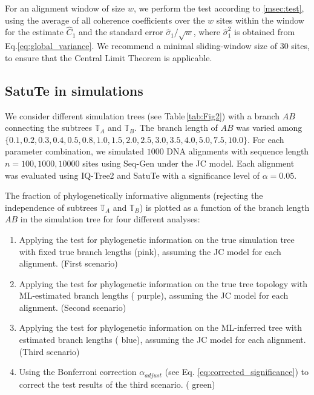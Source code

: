 For an alignment window of size $w$, we perform the test according to \ref{msec:test}, using the average of all coherence coefficients  over the $w$ sites within the window for the estimate $\hat C_1$ and  the standard error $\hat\sigma_1/\sqrt{w}$, where $\hat\sigma_1^2$ is obtained from Eq.\eqref{eq:global_variance}. 
We recommend a minimal sliding-window size of 30 sites, to ensure that the Central Limit Theorem is applicable.

\bigskip

\subsection{SatuTe in simulations}\label{msec:simulations}

We consider different simulation trees (see Table\,\ref{tab:Fig2}) with a branch $AB$ connecting the subtrees $\mathbb{T}_A$ and $\mathbb{T}_B$. The branch length of $AB$ was varied among $\{0.1, 0.2, 0.3, 0.4, 0.5, 0.8, 1.0, 1.5, 2.0, 2.5, 3.0, 3.5, 4.0, 5.0, 7.5, 10.0\}$. For each parameter combination, we simulated  $1000$ DNA alignments with sequence length ${n = 100, 1000, 10000}$ sites using Seq-Gen  under the JC model. Each alignment was evaluated using IQ-Tree2  and SatuTe with a significance level of $\alpha = 0.05$.


\medskip
\noindent The fraction of phylogenetically informative alignments (rejecting the independence of subtrees $\mathbb{T}_A$ and $\mathbb{T}_B$) is plotted as a function of the branch length $AB$ in the simulation tree for four different analyses:

\medskip

\begin{enumerate}
\item Applying the test for phylogenetic information on the true simulation tree with fixed true branch lengths ({\color{truetree}pink}), assuming the JC model for each alignment. (First scenario)
\item Applying the test for phylogenetic information on the true tree topology with ML-estimated branch lengths ({\color{truetreeML} purple}), assuming the JC model for each alignment. (Second scenario)
\item Applying the test for phylogenetic information on the ML-inferred tree with estimated branch lengths ({\color{MLtree} blue}), assuming the JC model for each alignment. (Third scenario) 
\item Using the  Bonferroni correction $\alpha_{adjust}$ (see Eq. \eqref{eq:corrected_significance}) to correct the test results of the third scenario. ({\color{MLtreeBonferroni} green})
\end{enumerate}

